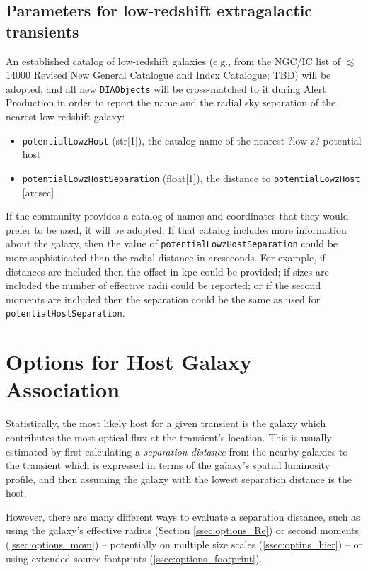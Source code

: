 \documentclass[DM,authoryear,toc]{lsstdoc}
\begin{document}
\subsection{Parameters for low-redshift extragalactic transients}\label{ssec:params_lowz}

An established catalog of low-redshift galaxies (e.g., from the NGC/IC list of $\lesssim$14000 Revised New General Catalogue and Index Catalogue; TBD) will be adopted, and all new {\tt DIAObjects} will be cross-matched to it during Alert Production in order to report the name and the radial sky separation of the nearest low-redshift galaxy:
\begin{itemize}
\item {\tt potentialLowzHost} (str[1]), the catalog name of the nearest ?low-z? potential host
\item {\tt potentialLowzHostSeparation} (float[1]), the distance to {\tt potentialLowzHost} [arcsec]
\end{itemize}

If the community provides a catalog of names and coordinates that they would prefer to be used, it will be adopted. 
If that catalog includes more information about the galaxy, then the value of {\tt potentialLowzHostSeparation} could be more sophisticated than the radial distance in arcseconds. 
For example, if distances are included then the offset in kpc could be provided; if sizes are included the number of effective radii could be reported; or if the second moments are included then the separation could be the same as used for {\tt potentialHostSeparation}. 



\section{Options for Host Galaxy Association}\label{sec:options}

Statistically, the most likely host for a given transient is the galaxy which contributes the most optical flux at the transient's location.
This is usually estimated by first calculating a \emph{separation distance} from the nearby galaxies to the transient which is expressed in terms of the galaxy's spatial luminosity profile, and then assuming the galaxy with the lowest separation distance is the host.

However, there are many different ways to evaluate a separation distance, such as using the galaxy's effective radius (Section \ref{ssec:options_Re}) or second moments (\ref{ssec:options_mom}) -- potentially on multiple size scales (\ref{ssec:optins_hier}) -- or using extended source footprints (\ref{ssec:options_footprint}).
\end{document}

